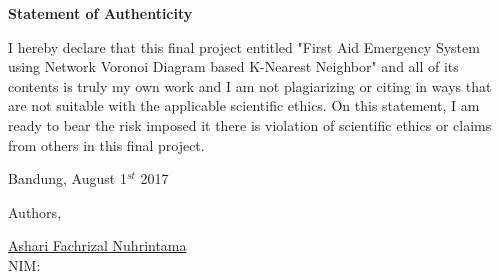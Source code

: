 {\centering
\textbf{\large Statement of Authenticity}\\  %
\vspace{1cm}
}

I hereby declare that this final project entitled "First Aid Emergency System using Network Voronoi Diagram based K-Nearest Neighbor" and all of its contents is truly my own work and I am not plagiarizing or citing in ways that are not suitable with the applicable scientific ethics. On this statement, I am ready to bear the risk imposed it there is  violation of scientific ethics or claims from others in this final project. \\
	
\vspace{0.5cm}

\begin{flushleft}
{Bandung, August 1$^{st}$ 2017}\\
\vspace{0.5cm}

Authors,\\
\vspace{2cm}

\underline{Ashari Fachrizal Nuhrintama} \\ 
NIM: \NIM
\end{flushleft}
